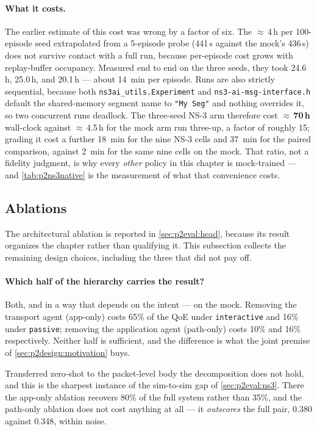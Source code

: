 \paragraph{What it costs.} The earlier estimate of this cost was wrong by a factor of six. The
${\approx}$\,4\,h per 100-episode seed extrapolated from a 5-episode probe (441\,s against the mock's
436\,s) does not survive contact with a full run, because per-episode cost grows with replay-buffer
occupancy. Measured end to end on the three seeds, they took 24.6\,h, 25.0\,h, and 20.1\,h --- about
\SI{14}{\minute} per episode. Runs are also strictly sequential, because both
\texttt{ns3ai\_utils.Experiment} and \texttt{ns3-ai-msg-interface.h} default the shared-memory segment
name to \texttt{"My Seg"} and nothing overrides it, so two concurrent runs deadlock. The three-seed NS-3
arm therefore cost \textbf{${\approx}$\,70\,h} wall-clock against ${\approx}$\,4.5\,h for the mock arm
run three-up, a factor of roughly 15; grading it cost a further \SI{18}{\minute} for the nine NS-3 cells
and \SI{37}{\minute} for the paired comparison, against \SI{2}{\minute} for the same nine cells on the
mock. That ratio, not a fidelity judgment, is why every \emph{other} policy in this chapter is
mock-trained --- and \cref{tab:p2ns3native} is the measurement of what that convenience costs.

\subsection{Ablations}
\label{sec:p2eval:ablation}

The architectural ablation is reported in \cref{sec:p2eval:head}, because its result organizes the
chapter rather than qualifying it. This subsection collects the remaining design choices, including the
three that did not pay off.

\paragraph{Which half of the hierarchy carries the result?} Both, and in a way that depends on the
intent --- on the mock. Removing the transport agent (app-only) costs 65\% of the QoE under
\texttt{interactive} and 16\% under \texttt{passive}; removing the application agent (path-only) costs
10\% and 16\% respectively. Neither half is sufficient, and the difference is what the joint premise of
\cref{sec:p2design:motivation} buys.

Transferred zero-shot to the packet-level body the decomposition does not hold, and this is the sharpest
instance of the sim-to-sim gap of \cref{sec:p2eval:ns3}. There the app-only ablation recovers 80\% of
the full system rather than 35\%, and the path-only ablation does not cost anything at all --- it
\emph{outscores} the full pair, 0.380 against 0.348, within noise.

